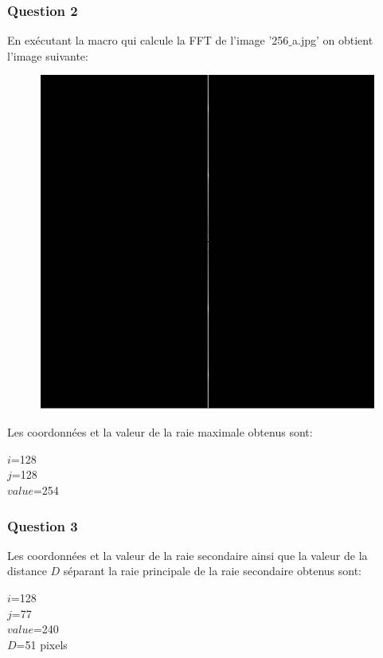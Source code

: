 \documentclass[a4paper,12pt]{report}
\begin{document}
\newpage

\subsubsection*{Question 2}
En exécutant la macro qui calcule la FFT de l'image '256$\_$a.jpg' on obtient l'image suivante:

\begin{figure}[!ht]
	\center
	\includegraphics[scale=0.5]{image/question2.png}
\end{figure}

	
Les coordonnées et la valeur de la raie maximale obtenus sont:
\begin{center}
	$i$=128 \\
	$j$=128 \\
	$value$=254
\end{center}

\newpage

\subsubsection*{Question 3}
Les coordonnées et la valeur de la raie secondaire ainsi que la valeur de la distance $D$ séparant la raie principale de la raie secondaire obtenus sont:
\begin{center}
$i$=128 \\
$j$=77 \\
$value$=240 \\
$D$=51 pixels
\end{center}
\end{document}
